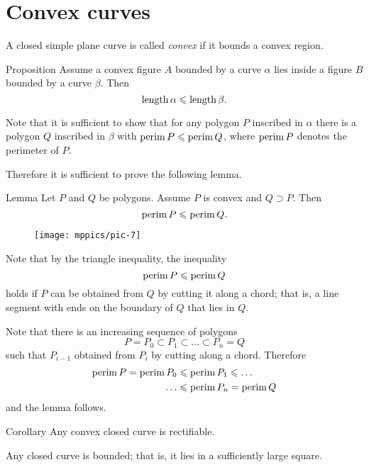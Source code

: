 \section*{Convex curves}

A closed simple plane curve is called \emph{convex} if it bounds a convex region.

\begin{thm}{Proposition}\label{prop:convex-curve}
Assume a convex figure $A$ bounded by a curve $\alpha$ lies inside a figure $B$ bounded by a curve $\beta$.
Then
\[\mathop{\rm length}\nolimits\alpha\leqslant \mathop{\rm length}\nolimits\beta.\]
\end{thm}

Note that it is sufficient to show that for any polygon  $P$ inscribed in $\alpha$ there is a polygon $Q$ inscribed in $\beta$ with 
$\mathop{\rm perim}\nolimits P\leqslant \mathop{\rm perim}\nolimits Q$, where $\mathop{\rm perim}\nolimits P$ denotes the perimeter of $P$.

Therefore it is sufficient to prove the following lemma.


\begin{thm}{Lemma}\label{lem:perimeter}
Let $P$ and $Q$ be polygons.
Assume $P$ is convex and $Q\supset P$.
Then 
\[\mathop{\rm perim}\nolimits P\leqslant \mathop{\rm perim}\nolimits Q.\]

\end{thm}


\begin{wrapfigure}{r}{24 mm}
\vskip-4mm
\centering
\texttt{[image: mppics/pic-7]}
\end{wrapfigure}

Note that by the triangle inequality,
the inequality
\[\mathop{\rm perim}\nolimits P\leqslant \mathop{\rm perim}\nolimits Q\]
holds
if $P$ can be obtained from $Q$ by cutting it along a chord;
that is, a line segment with ends on the boundary of $Q$ that lies in $Q$.


Note that there is an increasing sequence of polygons 
$$P=P_0\subset P_1\subset\dots\subset P_n=Q$$
such that $P_{i-1}$ obtained from $P_{i}$ by cutting along a chord.
Therefore 
\begin{align*}
\mathop{\rm perim}\nolimits P=\mathop{\rm perim}\nolimits P_0&\leqslant\mathop{\rm perim}\nolimits P_1\leqslant\dots
\\
\dots&\leqslant\mathop{\rm perim}\nolimits P_n=\mathop{\rm perim}\nolimits Q
\end{align*}
and the lemma follows.
\qeds

\begin{thm}{Corollary}
Any convex closed curve is rectifiable.  
\end{thm}

Any closed curve is bounded; that is, it lies in a sufficiently large square.


